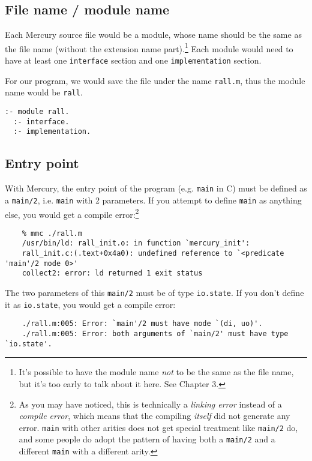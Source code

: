 \subsection{File name / module name}
\label{sec:orgc9a69eb}

Each Mercury source file would be a module, whose name should be the same as the file name (without the extension name part).\footnote{It's possible to have the module name \textit{not} to be the same as the file name, but it's too early to talk about it here. See Chapter 3.} Each module would need to have at least one \texttt{interface} section and one \texttt{implementation} section.

For our program, we would save the file under the name \texttt{rall.m}, thus the module name would be \texttt{rall}.

\begin{lstlisting}[language=Mercury]
  :- module rall.
  :- interface.
  :- implementation.
\end{lstlisting}

\subsection{Entry point}
\label{sec:orgb9eafbb}

With Mercury, the entry point of the program (e.g. \texttt{main} in C) must be defined as a \texttt{main/2}, i.e. \texttt{main} with 2 parameters. If you attempt to define \texttt{main} as anything else, you would get a compile error:\footnote{As you may have noticed, this is technically a \textit{linking error} instead of a \textit{compile error}, which means that the compiling \textit{itself} did not generate any error. \texttt{main} with other arities does not get special treatment like \texttt{main/2} do, and some people do adopt the pattern of having both a \texttt{main/2} and a different \texttt{main} with a different arity.}

\begin{lstlisting}
	% mmc ./rall.m
	/usr/bin/ld: rall_init.o: in function `mercury_init':
	rall_init.c:(.text+0x4a0): undefined reference to `<predicate 'main'/2 mode 0>'
	collect2: error: ld returned 1 exit status
\end{lstlisting}

The two parameters of this \texttt{main/2} must be of type \texttt{io.state}. If you don't define it as \texttt{io.state}, you would get a compile error:

\begin{lstlisting}
	./rall.m:005: Error: `main'/2 must have mode `(di, uo)'.
	./rall.m:005: Error: both arguments of `main/2' must have type `io.state'.
\end{lstlisting}

